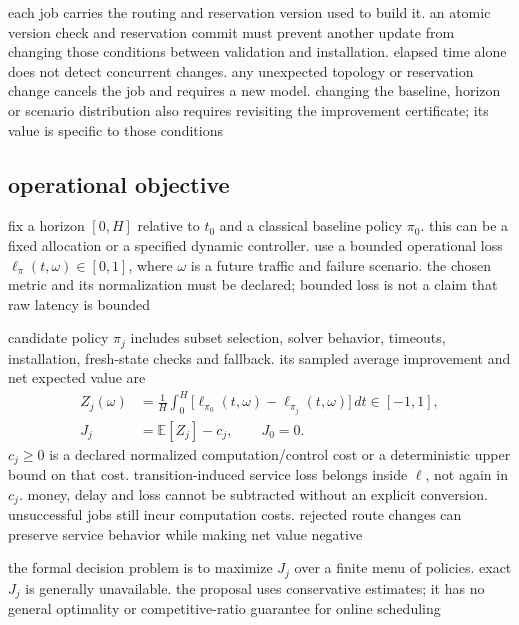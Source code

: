 \documentclass[11pt,a4paper]{article}
\newcommand{\E}{\mathbb{E}}
\newcommand{\1}{\mathbf{1}}
\begin{document}
each job carries the routing and reservation version used to build it. an atomic version check and reservation commit must prevent another update from changing those conditions between validation and installation. elapsed time alone does not detect concurrent changes. any unexpected topology or reservation change cancels the job and requires a new model. changing the baseline, horizon or scenario distribution also requires revisiting the improvement certificate; its value is specific to those conditions

\subsection{operational objective}
fix a horizon $[0,H]$ relative to $t_0$ and a classical baseline policy $\pi_0$. this can be a fixed allocation or a specified dynamic controller. use a bounded operational loss $\ell_\pi(t,\omega)\in[0,1]$, where $\omega$ is a future traffic and failure scenario. the chosen metric and its normalization must be declared; bounded loss is not a claim that raw latency is bounded

candidate policy $\pi_j$ includes subset selection, solver behavior, timeouts, installation, fresh-state checks and fallback. its sampled average improvement and net expected value are
\begin{align}
 Z_j(\omega)&=\frac{1}{H}\int_0^H\bigl[\ell_{\pi_0}(t,\omega)-\ell_{\pi_j}(t,\omega)\bigr]\,dt\in[-1,1],\label{eq:z}\\
 J_j&=\E[Z_j]-c_j,\qquad J_0=0.\label{eq:utility}
\end{align}
$c_j\ge0$ is a declared normalized computation/control cost or a deterministic upper bound on that cost. transition-induced service loss belongs inside $\ell$, not again in $c_j$. money, delay and loss cannot be subtracted without an explicit conversion. unsuccessful jobs still incur computation costs. rejected route changes can preserve service behavior while making net value negative

the formal decision problem is to maximize $J_j$ over a finite menu of policies. exact $J_j$ is generally unavailable. the proposal uses conservative estimates; it has no general optimality or competitive-ratio guarantee for online scheduling
\end{document}

